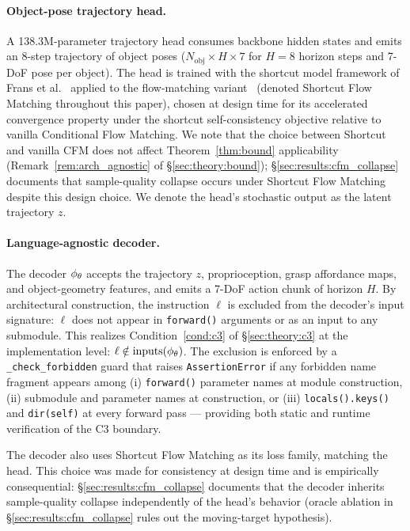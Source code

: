 \paragraph{Object-pose trajectory head.}
A 138.3M-parameter trajectory head consumes backbone hidden states and emits an 8-step
trajectory of object poses ($N_{\text{obj}} \times H \times 7$ for $H = 8$ horizon steps
and 7-DoF pose per object). The head is trained with the shortcut model framework of
Frans et al.~\cite{frans2024shortcut} applied to the flow-matching
variant~\cite{lipman2023flow_matching} (denoted Shortcut Flow Matching throughout this
paper), chosen at design time for its accelerated convergence property under the shortcut
self-consistency objective relative to vanilla Conditional Flow Matching. We note that the
choice between Shortcut and vanilla CFM does not affect Theorem~\ref{thm:bound}
applicability (Remark~\ref{rem:arch_agnostic} of \S\ref{sec:theory:bound});
\S\ref{sec:results:cfm_collapse} documents that sample-quality collapse occurs under
Shortcut Flow Matching despite this design choice. We denote the head's stochastic output
as the latent trajectory $z$.

\paragraph{Language-agnostic decoder.}
The decoder $\phi_{\theta}$ accepts the trajectory $z$, proprioception, grasp affordance maps,
and object-geometry features, and emits a 7-DoF action chunk of horizon $H$. By
architectural construction, the instruction $\ell$ is excluded from the decoder's input
signature: $\ell$ does not appear in \texttt{forward()} arguments or as an input to any
submodule. This realizes Condition~\ref{cond:c3} of \S\ref{sec:theory:c3} at the
implementation level: $\ell \notin \mathrm{inputs}(\phi_{\theta})$. The exclusion is enforced
by a \texttt{\_check\_forbidden} guard that raises \texttt{AssertionError} if any forbidden
name fragment appears among (i) \texttt{forward()} parameter names at module construction,
(ii) submodule and parameter names at construction, or (iii) \texttt{locals().keys()} and
\texttt{dir(self)} at every forward pass --- providing both static and runtime verification
of the C3 boundary.

The decoder also uses Shortcut Flow Matching as its loss family, matching the head. This
choice was made for consistency at design time and is empirically consequential:
\S\ref{sec:results:cfm_collapse} documents that the decoder inherits sample-quality
collapse independently of the head's behavior (oracle ablation in
\S\ref{sec:results:cfm_collapse} rules out the moving-target hypothesis).

